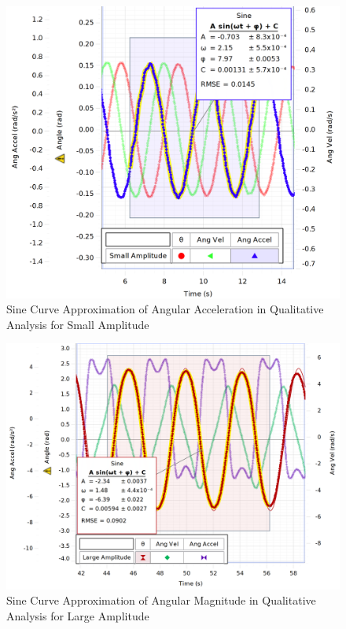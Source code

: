 \begin{figure}[H]
  \centering\includegraphics[width=15cm]{figQualitativeSmallAngle3.png}
  \caption{Sine Curve Approximation of Angular Acceleration in Qualitative Analysis for Small Amplitude}
  \label{figAngleAccelQualitativeSmallAngle}
\end{figure}
\begin{figure}[H]
  \centering\includegraphics[width=15cm]{figQualitativeLargeAngle.png}
  \caption{Sine Curve Approximation of Angular Magnitude in Qualitative Analysis for Large Amplitude}
  \label{figAngleQualitativeLargeAngle}
\end{figure}
